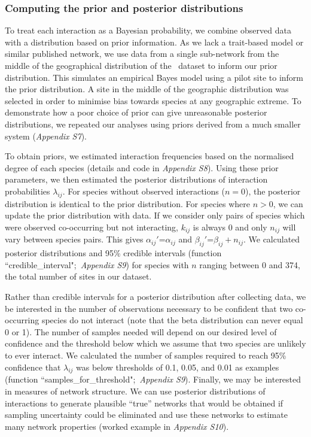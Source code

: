 \documentclass[12pt]{article}
\begin{document}
\begin{spacing}{2.0}
    \subsubsection*{Computing the prior and posterior distributions}

        To treat each interaction as a Bayesian probability, we combine observed data with a distribution based on prior information. As we lack a trait-based model or similar published network, we use data from a single sub-network from the middle of the geographical distribution of the~\citet{Kopelke2017} dataset to inform our prior distribution. This simulates an empirical Bayes model using a pilot site to inform the prior distribution. A site in the middle of the geographic distribution was selected in order to minimise bias towards species at any geographic extreme. To demonstrate how a poor choice of prior can give unreasonable posterior distributions, we repeated our analyses using priors derived from a much smaller system (\emph{Appendix S7}). 


        To obtain priors, we estimated interaction frequencies based on the normalised degree of each species (details and code in \emph{Appendix S8}). Using these prior parameters, we then estimated the posterior distributions of interaction probabilities $\lambda_{ij}$. For species without observed interactions ($n=0$), the posterior distribution is identical to the prior distribution. For species where $n>0$, we can update the prior distribution with data. If we consider only pairs of species which were observed co-occurring but not interacting, $k_{ij}$ is always 0 and only $n_{ij}$ will vary between species pairs. This gives $\alpha_{ij}'$=$\alpha_{ij}$ and $\beta_{ij}'$=$\beta_{ij}+n_{ij}$. We calculated posterior distributions and 95\% credible intervals (function ``credible\_interval";~\emph{Appendix S9}) for species with $n$ ranging between 0 and 374, the total number of sites in our dataset. 


        Rather than credible intervals for a posterior distribution after collecting data, we be interested in the number of observations necessary to be confident that two co-occurring species do not interact (note that the beta distribution can never equal 0 or 1). The number of samples needed will depend on our desired level of confidence and the threshold below which we assume that two species are unlikely to ever interact. We calculated the number of samples required to reach 95\% confidence that $\lambda_{ij}$ was below thresholds of 0.1, 0.05, and 0.01 as examples (function ``samples\_for\_threshold";~\emph{Appendix S9}). Finally, we may be interested in measures of network structure. We can use posterior distributions of interactions to generate plausible ``true'' networks that would be obtained if sampling uncertainty could be eliminated and use these networks to estimate many network properties (worked example in \emph{Appendix S10}).



\end{spacing}
\end{document}
